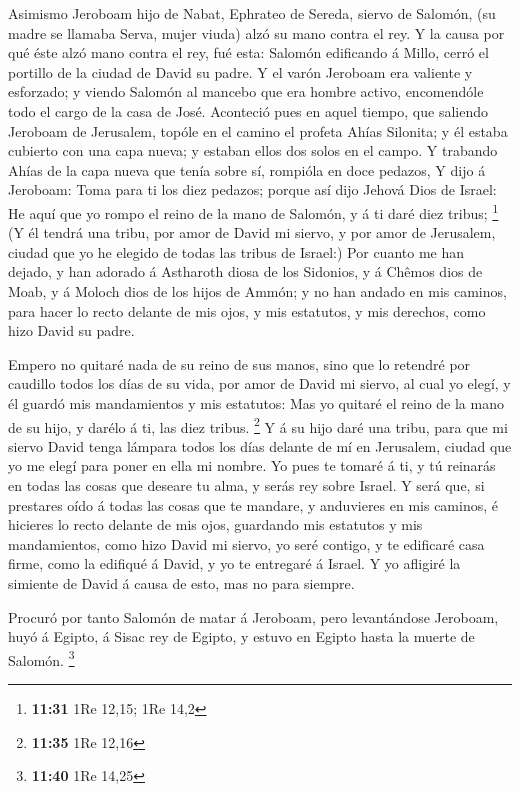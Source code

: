  Asimismo Jeroboam hijo de Nabat, Ephrateo de Sereda,
siervo de Salomón, (su madre se llamaba Serva, mujer viuda) alzó su mano
contra el rey.  Y la causa por qué éste alzó mano contra el
rey, fué esta: Salomón edificando á Millo, cerró el portillo de la
ciudad de David su padre.  Y el varón Jeroboam era valiente
y esforzado; y viendo Salomón al mancebo que era hombre activo,
encomendóle todo el cargo de la casa de José.  Aconteció
pues en aquel tiempo, que saliendo Jeroboam de Jerusalem, topóle en el
camino el profeta Ahías Silonita; y él estaba cubierto con una capa
nueva; y estaban ellos dos solos en el campo.  Y trabando
Ahías de la capa nueva que tenía sobre sí, rompióla en doce pedazos,
 Y dijo á Jeroboam: Toma para ti los diez pedazos; porque
así dijo Jehová Dios de Israel: He aquí que yo rompo el reino de la mano
de Salomón, y á ti daré diez tribus; \footnote{\textbf{11:31} 1Re 12,15;
  1Re 14,2}  (Y él tendrá una tribu, por amor de David mi
siervo, y por amor de Jerusalem, ciudad que yo he elegido de todas las
tribus de Israel:)  Por cuanto me han dejado, y han adorado
á Astharoth diosa de los Sidonios, y á Chêmos dios de Moab, y á Moloch
dios de los hijos de Ammón; y no han andado en mis caminos, para hacer
lo recto delante de mis ojos, y mis estatutos, y mis derechos, como hizo
David su padre.

 Empero no quitaré nada de su reino de sus manos, sino que
lo retendré por caudillo todos los días de su vida, por amor de David mi
siervo, al cual yo elegí, y él guardó mis mandamientos y mis estatutos:
 Mas yo quitaré el reino de la mano de su hijo, y darélo á
ti, las diez tribus. \footnote{\textbf{11:35} 1Re 12,16}  Y
á su hijo daré una tribu, para que mi siervo David tenga lámpara todos
los días delante de mí en Jerusalem, ciudad que yo me elegí para poner
en ella mi nombre.  Yo pues te tomaré á ti, y tú reinarás
en todas las cosas que deseare tu alma, y serás rey sobre Israel.
 Y será que, si prestares oído á todas las cosas que te
mandare, y anduvieres en mis caminos, é hicieres lo recto delante de mis
ojos, guardando mis estatutos y mis mandamientos, como hizo David mi
siervo, yo seré contigo, y te edificaré casa firme, como la edifiqué á
David, y yo te entregaré á Israel.  Y yo afligiré la
simiente de David á causa de esto, mas no para siempre.

 Procuró por tanto Salomón de matar á Jeroboam, pero
levantándose Jeroboam, huyó á Egipto, á Sisac rey de Egipto, y estuvo en
Egipto hasta la muerte de Salomón. \footnote{\textbf{11:40} 1Re 14,25}

